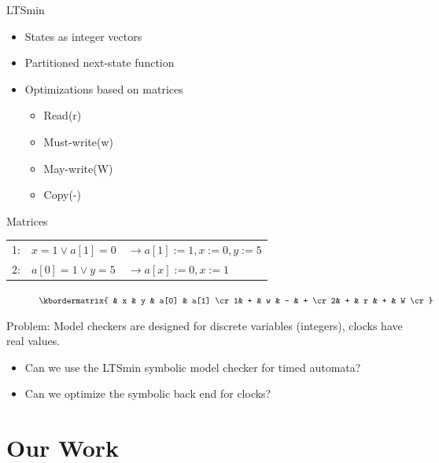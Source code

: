 \begin{frame}{LTSmin}
	\begin{itemize}
		\item States as integer vectors
	 	\item Partitioned next-state function
	 	\item Optimizations based on matrices
	 	\begin{itemize}
	 		\item Read(r)
	 		\item Must-write(w)
	 		\item May-write(W)
	 		\item Copy(-)
	 	\end{itemize}
	\end{itemize}
\end{frame}

\begin{frame}{Matrices}
\begin{center}
    \begin{tabular}{lll}
    1: & $x = 1 \vee a[1] = 0$ & $\rightarrow a[1] := 1, x:=0 , y:=5$  \\
    2: & $a[0] = 1 \vee y = 5$                     & $\rightarrow a[x] := 0, x:= 1$ \\
    \end{tabular}
\end{center}

\begin{figure}[h]
\centering
	\begin{math}
 \kbordermatrix{ 		               & x & y & a[0] & a[1] \cr
 									  1& + & w & -    & +    \cr
 									  2& + & r & +    & W    \cr}
	\end{math}
\end{figure}
\end{frame}

\begin{frame}
Problem: Model checkers are designed for discrete variables (integers), clocks have real values.
\begin{itemize}
\item Can we use the LTSmin symbolic model checker for timed automata?
\item Can we optimize the symbolic back end for clocks?
\end{itemize}
\end{frame}

\section{Our Work}

